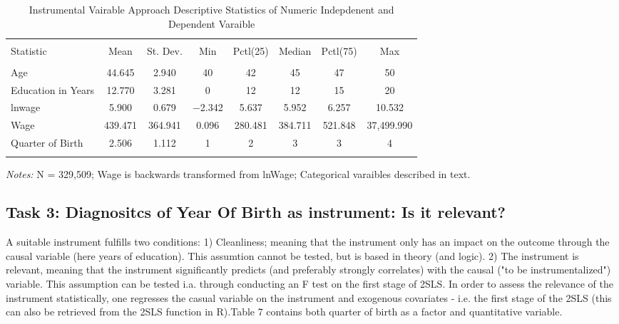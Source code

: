 \documentclass[a4paper]{article}
\begin{document}
\begin{table}[!htbp] 
\begin{adjustwidth}{-0cm}{-0cm}
\begin{threeparttable}
\small
\captionsetup{font=small, justification=raggedright,singlelinecheck=false}
  \caption{Instrumental Vairable Approach Descriptive Statistics of Numeric Indepdenent and Dependent Varaible} 
  \label{} 
\begin{tabular}{@{\extracolsep{5pt}}lccccccc} 
\\[-5.8ex]\hline 
\hline \\[-1.8ex] 
Statistic & \multicolumn{1}{c}{Mean} & \multicolumn{1}{c}{St. Dev.} & \multicolumn{1}{c}{Min} & \multicolumn{1}{c}{Pctl(25)} & \multicolumn{1}{c}{Median} & \multicolumn{1}{c}{Pctl(75)} & \multicolumn{1}{c}{Max} \\ 
\hline \\[-1.8ex] 
Age & 44.645 & 2.940 & 40 & 42 & 45 & 47 & 50 \\ 
Education in Years & 12.770 & 3.281 & 0 & 12 & 12 & 15 & 20 \\ 
lnwage & 5.900 & 0.679 & $-$2.342 & 5.637 & 5.952 & 6.257 & 10.532 \\ 
Wage & 439.471 & 364.941 & 0.096 & 280.481 & 384.711 & 521.848 & 37,499.990 \\ 
Quarter of Birth & 2.506 & 1.112 & 1 & 2 & 3 & 3 & 4 \\ 
\hline \\
[-3.5ex] 
\end{tabular} 
\begin{tablenotes}
      \small
      \item\textit{Notes:} N = 329,509; Wage is backwards transformed from lnWage; Categorical varaibles described in text.
    \end{tablenotes}
\end{threeparttable}
\end{adjustwidth}
\end{table}



\subsection{Task 3: Diagnositcs of Year Of Birth as instrument: Is it relevant?}
A suitable instrument fulfills two conditions: 1) Cleanliness; meaning that the instrument only has an impact on the outcome through the causal variable (here years of education). This assumtion cannot be tested, but is based in theory (and logic).
2) The instrument is relevant, meaning that the instrument significantly predicts (and preferably strongly correlates) with the causal ("to be instrumentalized") variable. This assumption can be tested i.a. through conducting an F test on the first stage of 2SLS. 
In order to assess the relevance of the instrument statistically, one regresses the casual variable on the instrument and exogenous covariates - i.e. the first stage of the 2SLS (this can also be retrieved from the 2SLS function in R).Table 7 contains both quarter of birth as a factor and quantitative variable. 
\end{document}

